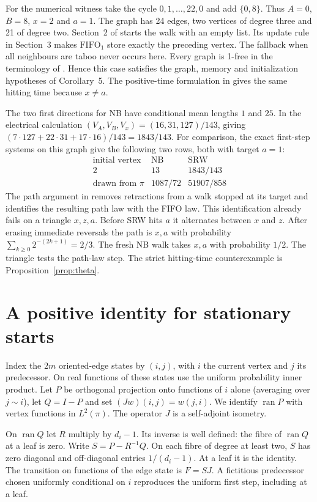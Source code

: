 \documentclass[11pt]{article}
\newcommand{\ran}{\operatorname{ran}}
\begin{document}
For the numerical witness take the cycle $0,1,\ldots,22,0$ and add
$\{0,8\}$. Thus $A=0$, $B=8$, $x=2$ and $a=1$. The graph has
24 edges, two vertices of degree three and 21 of degree two.
Section~2 of \cite{ADGL} starts the walk with an empty list. Its update
rule in Section~3 makes $\mathrm{FIFO}_1$ store exactly the preceding
vertex. The fallback when all neighbours are taboo never occurs here.
Every graph is 1-free in the terminology of \cite[Sec.~4]{ADGL}.
Hence this case satisfies the graph, memory and initialization hypotheses
of Corollary~5. The positive-time formulation in \cite[Cor.~9]{TR}
gives the same hitting time because $x\ne a$.

The two first directions for NB have conditional mean lengths $1$ and
$25$. In the electrical calculation $(V_A,V_B,V_x)=(16,31,127)/143$,
giving $(7\cdot127+22\cdot31+17\cdot16)/143=1843/143$.
For comparison, the exact first-step systems on this graph give the
following two rows, both with target $a=1$:
\[
\begin{array}{lcc}
 \text{initial vertex}&\text{NB}&\text{SRW}\\ \hline
 2 &13&1843/143\\[2pt]
 \text{drawn from }\pi&1087/72&51907/858
\end{array}
\]
The path argument in \cite[Sec.~6]{TR} removes retractions from a walk
stopped at its target and identifies the resulting path law with the FIFO
law. This identification already fails on a triangle $x,z,a$. Before SRW
hits $a$ it alternates between $x$ and $z$. After erasing immediate
reversals the path is $x,a$ with probability
$\sum_{k\ge0}2^{-(2k+1)}=2/3$. The fresh NB walk takes $x,a$ with
probability $1/2$. The triangle tests the path-law step. The strict
hitting-time counterexample is Proposition~\ref{prop:theta}.

\section{A positive identity for stationary starts}\label{sec:energy}
Index the $2m$ oriented-edge states by $(i,j)$, with $i$ the current vertex
and $j$ its predecessor. On real functions of these states use the uniform
probability inner product. Let $P$ be orthogonal projection onto functions
of $i$ alone (averaging over $j\sim i$), let $Q=I-P$ and set
$(Jw)(i,j)=w(j,i)$. We identify $\ran P$ with vertex functions in
$L^2(\pi)$. The operator $J$ is a self-adjoint isometry.

On $\ran Q$ let $R$ multiply by $d_i-1$. Its inverse is well defined:
the fibre of $\ran Q$ at a leaf is zero. Write $S=P-R^{-1}Q$.
On each fibre of degree at least two, $S$ has zero diagonal and off-diagonal
entries $1/(d_i-1)$. At a leaf it is the identity. The transition on
functions of the edge state is $F=SJ$. A fictitious predecessor chosen
uniformly conditional on $i$ reproduces the uniform first step, including
at a leaf.
\end{document}
